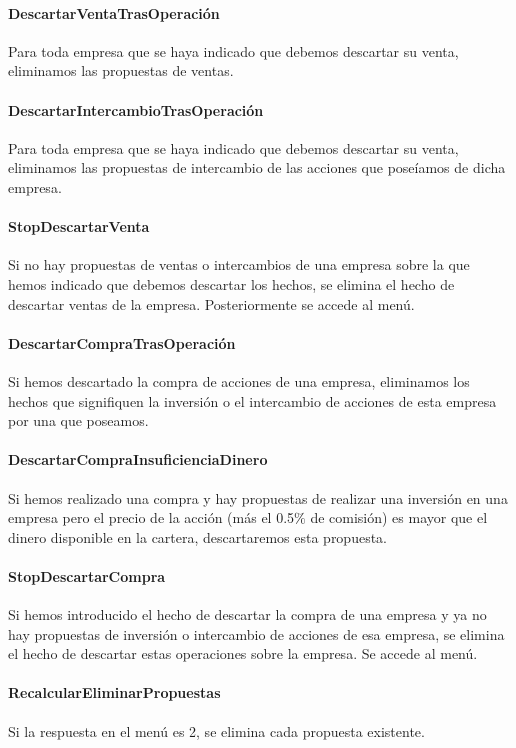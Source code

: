 \documentclass[11pt,leqno]{article}
\theoremstyle{definition_wo_parentheses}
\theoremstyle{plain}
\theoremstyle{remark}
\begin{document}
\paragraph{DescartarVentaTrasOperación} Para toda empresa que se haya indicado que debemos descartar su venta, eliminamos las propuestas de ventas.

\paragraph{DescartarIntercambioTrasOperación} Para toda empresa que se haya indicado que debemos descartar su venta, eliminamos las propuestas de intercambio de las acciones que poseíamos de dicha empresa.

\paragraph{StopDescartarVenta} Si no hay propuestas de ventas o intercambios de una empresa sobre la que hemos indicado que debemos descartar los hechos, se elimina el hecho de descartar ventas de la empresa. Posteriormente se accede al menú.

\paragraph{DescartarCompraTrasOperación} Si hemos descartado la compra de acciones de una empresa, eliminamos los hechos que signifiquen la inversión o el intercambio de acciones de esta empresa por una que poseamos.

\paragraph{DescartarCompraInsuficienciaDinero} Si hemos realizado una compra y hay propuestas de realizar una inversión en una empresa pero el precio de la acción (más el 0.5$\%$ de comisión) es mayor que el dinero disponible en la cartera, descartaremos esta propuesta.


\paragraph{StopDescartarCompra} Si hemos introducido el hecho de descartar la compra de una empresa y ya no hay propuestas de inversión o intercambio de acciones de esa empresa, se elimina el hecho de descartar estas operaciones sobre la empresa. Se accede al menú.

\paragraph{RecalcularEliminarPropuestas} Si la respuesta en el menú es 2, se elimina cada propuesta existente. 
\end{document}
